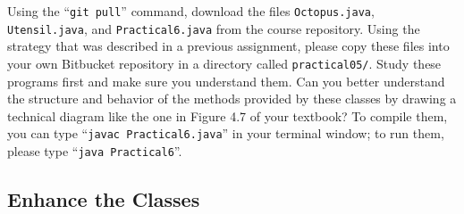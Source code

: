\begin{sloppypar}
Using the ``{\tt git pull}'' command, download the files {\tt Octopus.java}, {\tt Utensil.java}, and {\tt Practical6.java}
from the course repository. Using the strategy that was described in a previous assignment, please copy these files into
your own Bitbucket repository in a directory called {\tt practical05/}. Study these programs first and make sure you
understand them. Can you better understand the structure and behavior of the methods provided by these classes by
drawing a technical diagram like the one in Figure 4.7 of your textbook? To compile them, you can type ``{\tt javac
  Practical6.java}'' in your terminal window; to run them, please type ``{\tt java Practical6}''.
\end{sloppypar}

\vspace*{-.15in}
\subsection*{Enhance the Classes}
\vspace*{-.05in}

